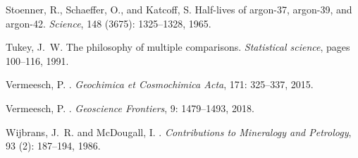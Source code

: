 \documentclass{article}
\begin{document}
\begin{thebibliography}{12}
Stoenner, R., Schaeffer, O., and Katcoff, S.
\newblock Half-lives of argon-37, argon-39, and argon-42.
\newblock \emph{Science}, 148 (3675): 1325--1328, 1965.

Tukey, J.~W.
\newblock The philosophy of multiple comparisons.
\newblock \emph{Statistical science}, pages 100--116, 1991.

Vermeesch, P.
.
\newblock \emph{Geochimica et Cosmochimica Acta}, 171: 325--337, 2015.

Vermeesch, P.
.
\newblock \emph{Geoscience Frontiers}, 9: 1479--1493, 2018.

Wijbrans, J.~R. and McDougall, I.
.
\newblock \emph{Contributions to Mineralogy and Petrology}, 93
  (2): 187--194, 1986.

\end{thebibliography}
\end{document}

